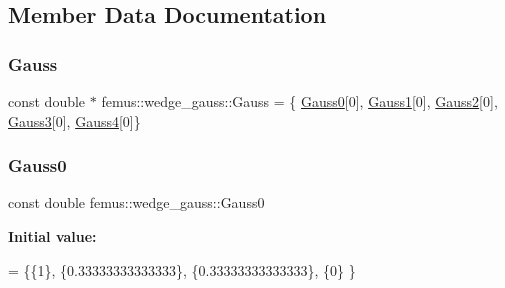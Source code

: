 \subsection{Member Data Documentation}
\mbox{\label{classfemus_1_1wedge__gauss_a14e9aad467413752cfa48ae00b14e14e}} 
\subsubsection{\texorpdfstring{Gauss}{Gauss}}
{\footnotesize\ttfamily const double $\ast$ femus\+::wedge\+\_\+gauss\+::\+Gauss = \{ \mbox{\hyperlink{classfemus_1_1wedge__gauss_a653a7e044d72300650adffcbf08128e6}{Gauss0}}\mbox{[}0\mbox{]}, \mbox{\hyperlink{classfemus_1_1wedge__gauss_adf988cd0b689da6fbd93a35353d42f6c}{Gauss1}}\mbox{[}0\mbox{]}, \mbox{\hyperlink{classfemus_1_1wedge__gauss_a933b0be3c70f8720ef2bf30150199769}{Gauss2}}\mbox{[}0\mbox{]}, \mbox{\hyperlink{classfemus_1_1wedge__gauss_ac2d1c542cde6a0e3ba11113234b7e511}{Gauss3}}\mbox{[}0\mbox{]}, \mbox{\hyperlink{classfemus_1_1wedge__gauss_a3d933a8ba8b6d4f1a629787a468eddf8}{Gauss4}}\mbox{[}0\mbox{]}\}\hspace{0.3cm}{\ttfamily [static]}}

\mbox{\label{classfemus_1_1wedge__gauss_a653a7e044d72300650adffcbf08128e6}} 
\subsubsection{\texorpdfstring{Gauss0}{Gauss0}}
{\footnotesize\ttfamily const double femus\+::wedge\+\_\+gauss\+::\+Gauss0\hspace{0.3cm}{\ttfamily [static]}}

{\bfseries Initial value\+:}
\begin{DoxyCode}
= \{\{1\},
    \{0.33333333333333\},
    \{0.33333333333333\},
    \{0\}
  \}
\end{DoxyCode}
\mbox{\label{classfemus_1_1wedge__gauss_adf988cd0b689da6fbd93a35353d42f6c}} 
